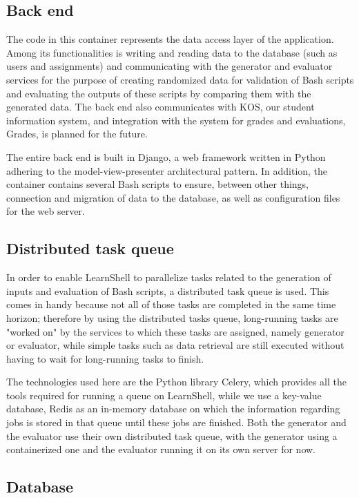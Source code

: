 \documentclass[thesis=B,english]{FITthesis}[2019/12/23]
\begin{document}
\subsection{Back end}

The code in this container represents the data access layer of the application. Among its functionalities is writing and reading data to the database (such as users and assignments) and communicating with the generator and evaluator services for the purpose of creating randomized data for validation of Bash scripts and evaluating the outputs of these scripts by comparing them with the generated data. \cite{learnshell-borsky} The back end also communicates with KOS, our student information system, and integration with the system for grades and evaluations, Grades, is planned for the future.

The entire back end is built in Django, a web framework written in Python adhering to the model-view-presenter architectural pattern. In addition, the container contains several Bash scripts to ensure, between other things, connection and migration of data to the database, as well as configuration files for the web server.

\subsection{Distributed task queue}

In order to enable LearnShell to parallelize tasks related to the generation of inputs and evaluation of Bash scripts, a distributed task queue is used. This comes in handy because not all of those tasks are completed in the same time horizon; therefore by using the distributed tasks queue, long-running tasks are "worked on" by the services to which these tasks are assigned, namely generator or evaluator, while simple tasks such as data retrieval are still executed without having to wait for long-running tasks to finish.

The technologies used here are the Python library Celery, which provides all the tools required for running a queue on LearnShell, while we use a key-value database, Redis as an in-memory database on which the information regarding jobs is stored in that queue until these jobs are finished. Both the generator and the evaluator use their own distributed task queue, with the generator using a containerized one and the evaluator running it on its own server for now.

\subsection{Database}
\end{document}

